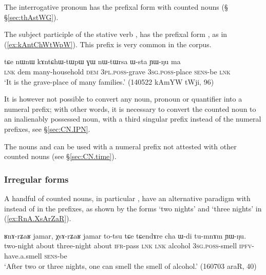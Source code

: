 The interrogative pronoun  has the prefixal form  with counted nouns (§ §\ref{sec:thAstWG}). 

The subject participle   of the stative verb ,  has the prefixal form , as in (\ref{ex:kAntChWtWpW}). This prefix is very common in the corpus.

\begin{exe}
\ex \label{ex:kAntChWtWpW}
\gll  tɕe nɯnɯ kɤntɕhɯ-tɯpɯ ɣɯ nɯ-tɯrsa ɯ-sta ɲɯ-ŋu ma \\
 \textsc{lnk} dem many-household \textsc{dem} \textsc{3pl}.\textsc{poss}-grave \textsc{3sg}.\textsc{poss}-place \textsc{sens}-be \textsc{lnk} \\
\glt `It is the grave-place of many families.' (140522 kAmYW tWji, 96)
\end{exe}

It is however not possible to convert any noun, pronoun or quantifier into a numeral prefix; with other words, it is necessary to convert the counted noun to an inalienably possessed noun, with a third singular  prefix instead of the numeral prefixes, see §\ref{sec:CN.IPN}.  

The nouns  and  can be used with a numeral prefix  not attested with other counted nouns (see §\ref{sec:CN.time}).

\subsubsection{Irregular forms} \label{sec:irregular.numeral.prefixes}
A handful of counted nouns, in particular , have an alternative paradigm with  instead of  in the prefixes, as shown by the forms  `two nights' and  `three nights' in (\ref{ex:RnA.XsArZaR}).

\begin{exe}
	\ex \label{ex:RnA.XsArZaR}
	\gll ʁnɤ-rʑaʁ jamar, χsɤ-rʑaʁ jamar to-tsu tɕe tɕendɤre cha ɯ-di tu-mnɤm ɲɯ-ŋu. \\
	two-night about three-night about \textsc{ifr}-pass \textsc{lnk} \textsc{lnk} alcohol \textsc{3sg}.\textsc{poss}-smell \textsc{ipfv}-have.a.smell \textsc{sens}-be \\
	\glt `After two or three nights, one can smell the smell of alcohol.' (160703 araR, 40)
\end{exe}

